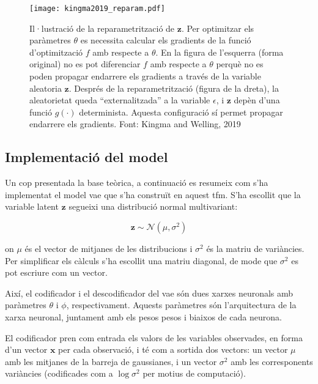 \documentclass[CAT,BIB]{TFUOC}%
\begin{document}
        \begin{figure}
            \centering
            \texttt{[image: kingma2019\_reparam.pdf]}
            \caption[Reparametrització de $\mathbf{z}$]{
                Il·lustració de la reparametrització de $\mathbf{z}$.
                Per optimitzar els paràmetres $\theta$
                es necessita calcular els gradients de la funció d'optimització $f$
                amb respecte a $\theta$.
                En la figura de l'esquerra (forma original)
                no es pot diferenciar $f$ amb respecte a $\theta$
                perquè no es poden propagar endarrere els gradients
                a través de la variable aleatoria $\mathbf{z}$.
                Després de la reparametrització (figura de la dreta),
                la aleatorietat queda ``externalitzada'' a la variable $\epsilon$,
                i $\mathbf{z}$ depèn d'una funció $g(\cdot)$ determinista.
                Aquesta configuració sí permet propagar endarrere els gradients.
                Font: Kingma and Welling, 2019 \citep{Kingma2019}
            }
            \label{fig:reparametritzacio}
        \end{figure}

    \subsection{Implementació del model}
    \label{s:vae_implementacio}

        Un cop presentada la base teòrica,
        a continuació es resumeix com s'ha implementat el model \gls{vae}
        que s'ha construït en aquest \gls{tfm}.
        S'ha escollit que la variable latent $\mathbf{z}$
        segueixi una distribució normal multivariant:

        $$\mathbf{z} \sim \mathcal{N}(\mu, \sigma^2)$$

        on $\mu$ és el vector de mitjanes de les distribucions
        i $\sigma^2$ és la matriu de variàncies.
        Per simplificar els càlculs s'ha escollit una matriu diagonal,
        de mode que $\sigma^2$ es pot escriure com un vector.

        Així, el codificador i el descodificador del \gls{vae} són
        dues xarxes neuronals amb paràmetres $\theta$ i $\phi$, respectivament.
        Aquests paràmetres són l'arquitectura de la xarxa neuronal,
        juntament amb els pesos pesos i biaixos de cada neurona.

        El codificador pren com entrada els valors de les variables observades,
        en forma d'un vector $\mathbf{x}$ per cada observació,
        i té com a sortida dos vectors:
        un vector $\mu$ amb les mitjanes de la barreja de gaussianes,
        i un vector $\sigma^2$ amb les corresponents variàncies
        (codificades com a $\log \sigma^2$ per motius de computació).
\end{document}

